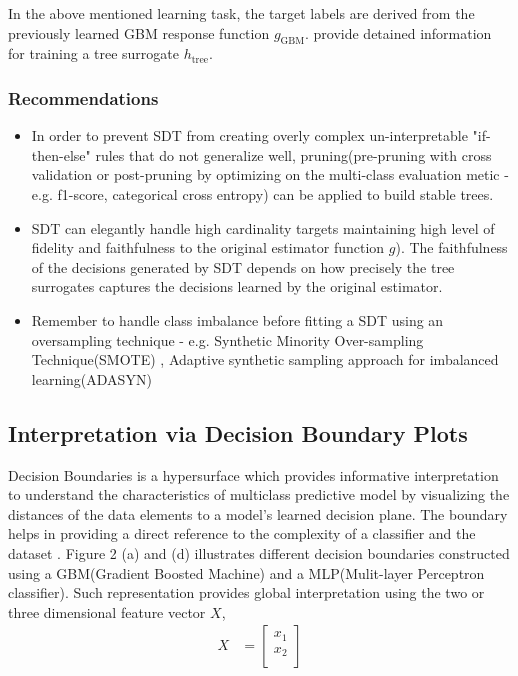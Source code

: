 \documentclass{article}
\begin{document}
In the above mentioned learning task, the target labels are derived from the previously learned GBM response function $g_{\text{GBM}}$. \cite{dt_surrogate1} \cite{dt_surrogate2} provide detained information for training a tree surrogate $h_{\text{tree}}$. 
\subsubsection{Recommendations}
\begin{itemize}
\item In order to prevent SDT from creating overly complex un-interpretable "if-then-else" rules that do not generalize well, pruning(pre-pruning with cross validation or post-pruning by optimizing on the multi-class evaluation metic - e.g. f1-score, categorical cross entropy) can be applied to build stable trees.
\item SDT can elegantly handle high cardinality targets maintaining high level of fidelity and faithfulness to the original  estimator function $g$). The faithfulness of the decisions generated by SDT depends on how precisely the tree surrogates captures the decisions learned by the original estimator.
\item Remember to handle class imbalance before fitting a SDT using an oversampling technique - e.g. Synthetic Minority Over-sampling Technique(SMOTE) \cite{chawla2002smote}, Adaptive synthetic sampling approach for imbalanced learning(ADASYN)\cite{he2008adasyn}
\end{itemize}

\subsection{Interpretation via Decision Boundary Plots}
Decision Boundaries is a hypersurface which provides informative interpretation to understand the characteristics of multiclass predictive model by visualizing the distances of the data elements to a model's learned decision plane. The boundary helps in providing a direct reference to the complexity of a classifier and the dataset \cite{rao1997visualizing} \cite{migut2015visualizing}. Figure 2 (a) and (d) illustrates different decision boundaries constructed using a GBM(Gradient Boosted Machine) and a MLP(Mulit-layer Perceptron classifier).
Such representation provides global interpretation using the two or three dimensional feature vector $X$,
\begin{align}
    X &= \begin{bmatrix}
           x_{1} \\
           x_{2} \\
         \end{bmatrix}
\end{align}
\end{document}
